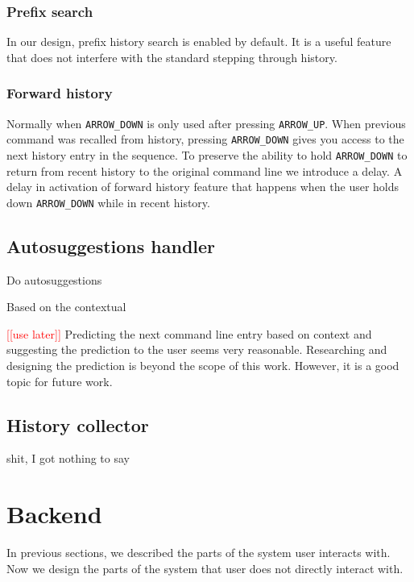 \documentclass[thesis=M,english]{FITthesis}[2012/10/20]
\newcommand{\redtext}[1]{\textcolor{red}{[[#1]]}}
\begin{document}
\subsubsection{Prefix search}

In our design, prefix history search is enabled by default. It is a useful feature that does not interfere with the standard stepping through history. 

\subsubsection{Forward history}

Normally when \verb|ARROW_DOWN| is only used after pressing \verb|ARROW_UP|. 
When previous command was recalled from history, pressing \verb|ARROW_DOWN| gives you access to the next history entry in the sequence. To preserve the ability to hold \verb|ARROW_DOWN| to return from recent history to the original command line we introduce a delay. A delay in activation of forward history feature that happens when the user holds down \verb|ARROW_DOWN| while in recent history.

\subsection{Autosuggestions handler}

Do autosuggestions

Based on the contextual


\redtext{use later}
Predicting the next command line entry based on context and suggesting the prediction to the user seems very reasonable.
Researching and designing the prediction is beyond the scope of this work. However, it is a good topic for future work.

\subsection{History collector}

shit, I got nothing to say

\section{Backend}

In previous sections, we described the parts of the system user interacts with.
Now we design the parts of the system that user does not directly interact with.
\end{document}
